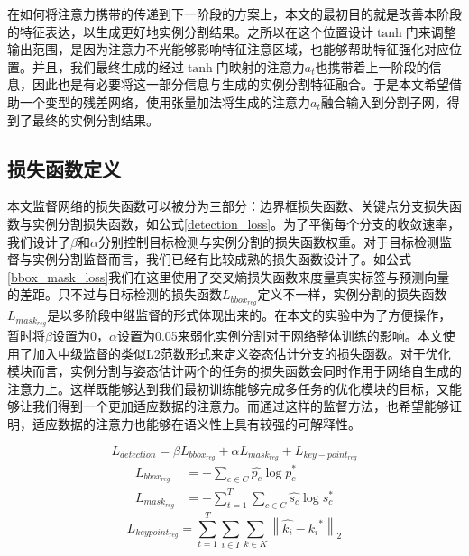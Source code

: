 在如何将注意力携带的传递到下一阶段的方案上，本文的最初目的就是改善本阶段的特征表达，以生成更好地实例分割结果。之所以在这个位置设计$\tanh$门来调整输出范围，是因为注意力不光能够影响特征注意区域，也能够帮助特征强化对应位置。并且，我们最终生成的经过$\tanh$门映射的注意力$a_t$也携带着上一阶段的信息，因此也是有必要将这一部分信息与生成的实例分割特征融合。于是本文希望借助一个变型的残差网络，使用张量加法将生成的注意力$a_t$融合输入到分割子网，得到了最终的实例分割结果。

\subsection{损失函数定义}
\label{subsec:lossfunctions}
本文监督网络的损失函数可以被分为三部分：边界框损失函数、关键点分支损失函数与实例分割损失函数，如公式\eqref{detection_loss}。为了平衡每个分支的收敛速率，我们设计了$\beta$和$\alpha$分别控制目标检测与实例分割的损失函数权重。对于目标检测监督与实例分割监督而言，我们已经有比较成熟的损失函数设计了。如公式\eqref{bbox_mask_loss}我们在这里使用了交叉熵损失函数来度量真实标签与预测向量的差距。只不过与目标检测的损失函数$L_{bbox_{reg}}$定义不一样，实例分割的损失函数$L_{mask_{reg}}$是以多阶段中继监督的形式体现出来的。在本文的实验中为了方便操作，暂时将$\beta$设置为0，$\alpha$设置为0.05来弱化实例分割对于网络整体训练的影响。本文使用了加入中级监督的类似L2范数形式来定义姿态估计分支的损失函数。对于优化模块而言，实例分割与姿态估计两个的任务的损失函数会同时作用于网络自生成的注意力上。这样既能够达到我们最初训练能够完成多任务的优化模块的目标，又能够让我们得到一个更加适应数据的注意力。而通过这样的监督方法，也希望能够证明，适应数据的注意力也能够在语义性上具有较强的可解释性。

\begin{equation}
\label{detection_loss}
L_{detection} = \beta L_{bbox_{reg}} + \alpha L_{mask_{reg}} + L_{key-point_{reg}}
\end{equation} 
\begin{equation}
\label{bbox_mask_loss}
\begin{aligned}
L_{bbox_{reg}} &= -\sum_{c \in C}{\hat{p_c} \log{p_c^{*}}} \\
L_{mask_{reg}} &= -\sum_{t=1}^{T}\sum_{c \in C}{\hat{s_c} \log{s_c^{*}}}
\end{aligned}
\end{equation}
\begin{equation}
\label{coarse_key-point_loss}
L_{keypoint_{reg}} = \sum_{t=1}^{T}\sum_{i \in I}\sum_{k \in K}{\left\| \hat{k_i} - {k_i}^{*} \right\|_2}
\end{equation}

